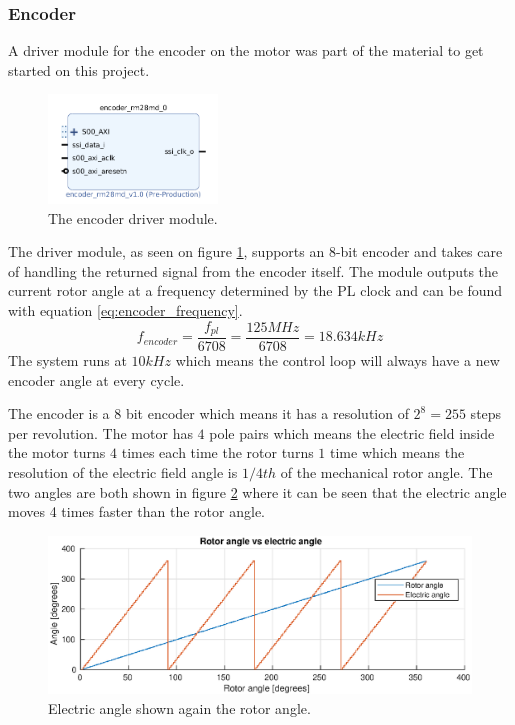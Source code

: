 \subsubsection{Encoder}
\label{sec:encoder}

A driver module for the encoder on the motor was part of the material to get started on this project. \cite{encoder_module}

\begin{figure}[H]
	\centering
	\includegraphics[width=0.4\textwidth]{pictures/software/encoder_module.png}
	\caption{The encoder driver module.}
	\label{fig:encoder_module}
\end{figure}
The driver module, as seen on figure \ref{fig:encoder_module}, supports an 8-bit encoder and takes care of handling the returned signal from the encoder itself. The module outputs the current rotor angle at a frequency determined by the PL clock and can be found with equation \ref{eq:encoder_frequency}.
\begin{equation}
f_{encoder} = \frac{f_{pl}}{6708} = \frac{125MHz}{6708} = 18.634kHz
\label{eq:encoder_frequency}
\end{equation}
The system runs at $10kHz$ which means the control loop will always have a new encoder angle at every cycle.


The encoder is a 8 bit encoder which means it has a resolution of $2^8 = 255$ steps per revolution. The motor has $4$ pole pairs which means the electric field inside the motor turns $4$ times each time the rotor turns $1$ time which means the resolution of the electric field angle is $1/4th$ of the mechanical rotor angle.
The two angles are both shown in figure \ref{fig:rotor_vs_electric_angle} where it can be seen that the electric angle moves 4 times faster than the rotor angle.

\begin{figure}[H]
	\centering
	\includegraphics[width=1\textwidth]{pictures/software/rotor_vs_electric_angle.eps}
	\caption{Electric angle shown again the rotor angle.}
	\label{fig:rotor_vs_electric_angle}
\end{figure}

